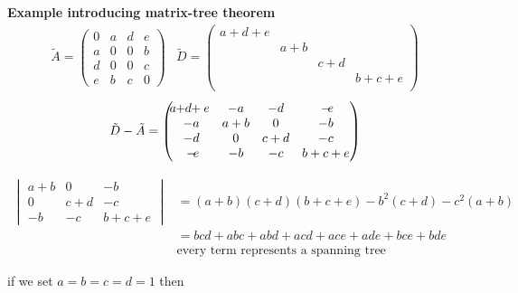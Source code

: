\textbf{Example introducing matrix-tree theorem}\\



\begin{equation*}
\begin{array}{ll}
	\tilde A = \begin{pmatrix}
		0 & a & d & e \\
		a & 0 & 0 & b \\
		d & 0 & 0 & c \\
		e & b & c & 0
	\end{pmatrix}
	&
	\tilde D = \begin{pmatrix}
		a+d+e \\
		& a+b \\
		& & c+d \\
		& & & b+c+e \\
	\end{pmatrix}
\end{array}
\end{equation*}
\begin{equation*}
	\tilde D - \tilde A = \begin{pmatrix}
		\tikzmark{topA}a+\tikzmark{topA2}d+e & -a & -d & -\tikzmark{topB}e \\
		 -a & a+b & 0 & -b \\
		-d & 0 & c+d & -c \\
		-\tikzmark{botA}e & -b & -c & b+c+e \\
	\end{pmatrix}
\end{equation*}

\begin{equation*}
\begin{array}{ll}
\begin{vmatrix}
	a+b & 0 & -b \\
	0 & c+d & -c \\
	-b & -c & b+c+e
\end{vmatrix}
& = (a+b)(c+d)(b+c+e)-b^2(c+d)-c^2(a+b) \\
& = bcd + abc+ abd +acd + ace + ade + bce + bde \\
& \text{every term represents a spanning tree}
\end{array}
\end{equation*}

if we set $a=b=c=d=1$ then

